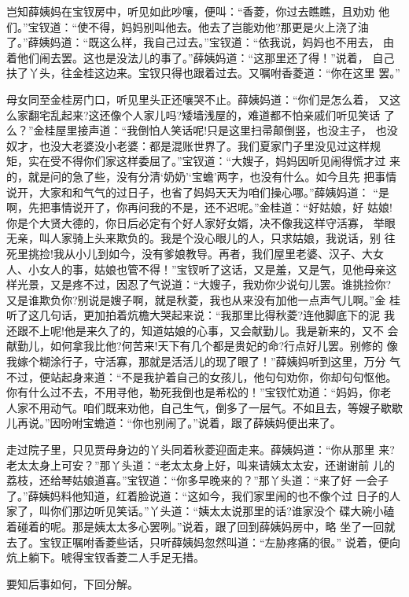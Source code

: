 岂知薛姨妈在宝钗房中，听见如此吵嚷，便叫：“香菱，你过去瞧瞧，且劝劝
他们。”宝钗道：“使不得，妈妈别叫他去。他去了岂能劝他?那更是火上浇了油
了。”薛姨妈道：“既这么样，我自己过去。”宝钗道：“依我说，妈妈也不用去，
由着他们闹去罢。这也是没法儿的事了。”薛姨妈道：“这那里还了得！”说着，
自己扶了丫头，往金桂这边来。宝钗只得也跟着过去。又嘱咐香菱道：“你在这里
罢。”

母女同至金桂房门口，听见里头正还嚷哭不止。薛姨妈道：“你们是怎么着，
又这么家翻宅乱起来?这还像个人家儿吗?矮墙浅屋的，难道都不怕亲戚们听见笑话
了么？”金桂屋里接声道：“我倒怕人笑话呢!只是这里扫帚颠倒竖，也没主子，
也没奴才，也没大老婆没小老婆：都是混账世界了。我们夏家门子里没见过这样规
矩，实在受不得你们家这样委屈了。”宝钗道：“大嫂子，妈妈因听见闹得慌才过
来的，就是问的急了些，没有分清‘奶奶’‘宝蟾’两字，也没有什么。如今且先
把事情说开，大家和和气气的过日子，也省了妈妈天天为咱们操心哪。”薛姨妈道：
“是啊，先把事情说开了，你再问我的不是，还不迟呢。”金桂道：“好姑娘，好
姑娘!你是个大贤大德的，你日后必定有个好人家好女婿，决不像我这样守活寡，
举眼无亲，叫人家骑上头来欺负的。我是个没心眼儿的人，只求姑娘，我说话，别
往死里挑捡!我从小儿到如今，没有爹娘教导。再者，我们屋里老婆、汉子、大女
人、小女人的事，姑娘也管不得！”宝钗听了这话，又是羞，又是气，见他母亲这
样光景，又是疼不过，因忍了气说道：“大嫂子，我劝你少说句儿罢。谁挑捡你?
又是谁欺负你?别说是嫂子啊，就是秋菱，我也从来没有加他一点声气儿啊。”金
桂听了这几句话，更加拍着炕檐大哭起来说：“我那里比得秋菱?连他脚底下的泥
我还跟不上呢!他是来久了的，知道姑娘的心事，又会献勤儿。我是新来的，又不
会献勤儿，如何拿我比他?何苦来!天下有几个都是贵妃的命?行点好儿罢。别修的
像我嫁个糊涂行子，守活寡，那就是活活儿的现了眼了！”薛姨妈听到这里，万分
气不过，便站起身来道：“不是我护着自己的女孩儿，他句句劝你，你却句句怄他。
你有什么过不去，不用寻他，勒死我倒也是希松的！”宝钗忙劝道：“妈妈，你老
人家不用动气。咱们既来劝他，自己生气，倒多了一层气。不如且去，等嫂子歇歇
儿再说。”因吩咐宝蟾道：“你也别闹了。”说着，跟了薛姨妈便出来了。

走过院子里，只见贾母身边的丫头同着秋菱迎面走来。薛姨妈道：“你从那里
来?老太太身上可安？”那丫头道：“老太太身上好，叫来请姨太太安，还谢谢前
儿的荔枝，还给琴姑娘道喜。”宝钗道：“你多早晚来的？”那丫头道：“来了好
一会子了。”薛姨妈料他知道，红着脸说道：“这如今，我们家里闹的也不像个过
日子的人家了，叫你们那边听见笑话。”丫头道：“姨太太说那里的话?谁家没个
碟大碗小磕着碰着的呢。那是姨太太多心罢咧。”说着，跟了回到薛姨妈房中，略
坐了一回就去了。宝钗正嘱咐香菱些话，只听薛姨妈忽然叫道：“左胁疼痛的很。”
说着，便向炕上躺下。唬得宝钗香菱二人手足无措。

要知后事如何，下回分解。